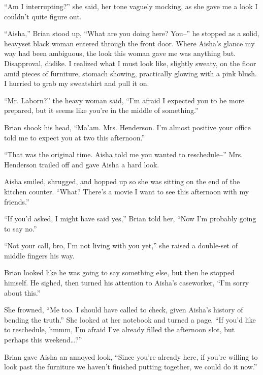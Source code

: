 ``Am I interrupting?'' she said, her tone vaguely mocking, as she gave me a look I couldn't quite figure out.



``Aisha,'' Brian stood up, ``What are you doing here?  You--'' he stopped as a solid, heavyset black woman entered through the front door.  Where Aisha's glance my way had been ambiguous, the look this woman gave me was anything but.  Disapproval, dislike.  I realized what I must look like, slightly sweaty, on the floor amid pieces of furniture, stomach showing, practically glowing with a pink blush.  I hurried to grab my sweatshirt and pull it on.



``Mr. Laborn?'' the heavy woman said, ``I'm afraid I expected you to be more prepared, but it seems like you're in the middle of something.''



Brian shook his head, ``Ma'am.  Mrs. Henderson.  I'm almost positive your office told me to expect you at two this afternoon.''



``That was the original time.  Aisha told me you wanted to reschedule--'' Mrs. Henderson trailed off and gave Aisha a hard look.



Aisha smiled, shrugged, and hopped up so she was sitting on the end of the kitchen counter.  ``What?  There's a movie I want to see this afternoon with my friends.''



``If you'd asked, I might have said yes,'' Brian told her, ``Now I'm probably going to say no.''



``Not your call, bro, I'm not living with you yet,'' she raised a double-set of middle fingers his way.



Brian looked like he was going to say something else, but then he stopped himself.  He sighed, then turned his attention to Aisha's caseworker, ``I'm sorry about this.''



She frowned, ``Me too.  I should have called to check, given Aisha's history of bending the truth.''  She looked at her notebook and turned a page, ``If you'd like to reschedule, hmmm, I'm afraid I've already filled the afternoon slot, but perhaps this weekend\ldots?''



Brian gave Aisha an annoyed look, ``Since you're already here, if you're willing to look past the furniture we haven't finished putting together, we could do it now.''



